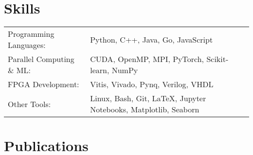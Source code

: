 \documentclass[a4paper,12pt]{article}
\begin{document}
\section{Skills}
\begin{tabularx}{\linewidth}{@{}l X@{}}
Programming Languages: & \normalsize{Python, C++, Java, Go, JavaScript} \\
Parallel Computing \& ML: & \normalsize{CUDA, OpenMP, MPI, PyTorch, Scikit-learn, NumPy} \\
FPGA Development: & \normalsize{Vitis, Vivado, Pynq, Verilog, VHDL} \\
Other Tools: & \normalsize{Linux, Bash, Git, LaTeX, Jupyter Notebooks, Matplotlib, Seaborn}\\
\end{tabularx}

\section{Publications}
\nocite{*}
\printbibliography[heading=none]

\vfill
{}
\end{document}
